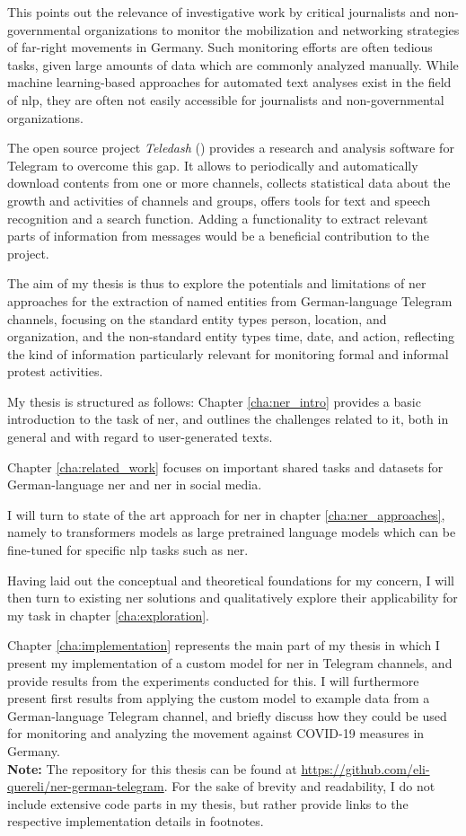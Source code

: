 This points out the relevance of investigative work by critical journalists and non-governmental organizations to monitor the mobilization and networking strategies of far-right movements in Germany. Such monitoring efforts are often tedious tasks, given large amounts of data which are commonly analyzed manually. While machine learning-based approaches for automated text analyses exist in the field of \gls{nlp}, they are often not easily accessible for journalists and non-governmental organizations.

The open source project \textit{Teledash} (\cite{teledash_2022}) provides a research and analysis software for Telegram to overcome this gap. It allows to periodically and automatically download contents from one or more channels, collects statistical data about the growth and activities of channels and groups, offers tools for text and speech recognition and a search function. Adding a functionality to extract relevant parts of information from messages would be a beneficial contribution to the project. 

The aim of my thesis is thus to explore the potentials and limitations of \gls{ner} approaches for the extraction of named entities from German-language Telegram channels, focusing on the standard entity types person, location, and organization, and the non-standard entity types time, date, and action, reflecting the kind of information particularly relevant for monitoring formal and informal protest activities. 

My thesis is structured as follows: Chapter \ref{cha:ner_intro} provides a basic introduction to the task of \gls{ner}, and outlines the challenges related to it, both in general and with regard to user-generated texts.

Chapter \ref{cha:related_work} focuses on important shared tasks and datasets for German-language \gls{ner} and \gls{ner} in social media.

I will turn to state of the art approach for \gls{ner} in chapter \ref{cha:ner_approaches}, namely to transformers models as large pretrained language models which can be fine-tuned for specific \gls{nlp} tasks such as \gls{ner}. 

Having laid out the conceptual and theoretical foundations for my concern, I will then turn to existing \gls{ner} solutions and qualitatively explore their applicability for my task in chapter \ref{cha:exploration}. 

Chapter \ref{cha:implementation} represents the main part of my thesis in which I present my implementation of a custom model for \gls{ner} in Telegram channels, and provide results from the experiments conducted for this. I will furthermore present first results from applying the custom model to example data from a German-language Telegram channel, and briefly discuss how they could be used for monitoring and analyzing the movement against COVID-19 measures in Germany. \\

\textbf{Note:} The repository for this thesis can be found at \url{https://github.com/eli-quereli/ner-german-telegram}. For the sake of brevity and readability, I do not include extensive code parts in my thesis, but rather provide links to the respective implementation details in footnotes. 